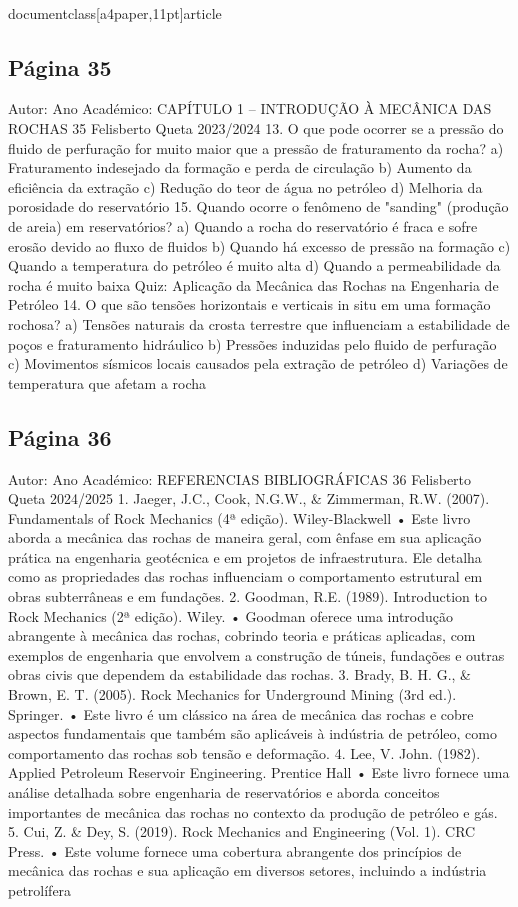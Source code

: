 \\documentclass[a4paper,11pt]{article}
\begin{document}
\subsection*{Página 35}
Autor:
Ano Académico:
CAPÍTULO 1 – INTRODUÇÃO À MECÂNICA DAS ROCHAS
35
Felisberto Queta
2023/2024
13. O que pode ocorrer se a pressão do fluido de perfuração for muito maior que a pressão de fraturamento da 
rocha?
a) Fraturamento indesejado da formação e perda de circulação
b) Aumento da eficiência da extração
c) Redução do teor de água no petróleo
d) Melhoria da porosidade do reservatório
15. Quando ocorre o fenômeno de "sanding" (produção de areia) em reservatórios?
a) Quando a rocha do reservatório é fraca e sofre erosão devido ao fluxo de fluidos
b) Quando há excesso de pressão na formação
c) Quando a temperatura do petróleo é muito alta
d) Quando a permeabilidade da rocha é muito baixa
Quiz: Aplicação da Mecânica das Rochas na Engenharia de Petróleo
14. O que são tensões horizontais e verticais in situ em uma formação rochosa?
a) Tensões naturais da crosta terrestre que influenciam a estabilidade de poços e fraturamento hidráulico
b) Pressões induzidas pelo fluido de perfuração
c) Movimentos sísmicos locais causados pela extração de petróleo
d) Variações de temperatura que afetam a rocha



\subsection*{Página 36}
Autor:
Ano Académico:
REFERENCIAS BIBLIOGRÁFICAS
36
Felisberto Queta
2024/2025
1. Jaeger, J.C., Cook, N.G.W., \& Zimmerman, R.W. (2007). Fundamentals of Rock Mechanics (4ª edição). 
Wiley-Blackwell
•
Este livro aborda a mecânica das rochas de maneira geral, com ênfase em sua aplicação prática na 
engenharia geotécnica e em projetos de infraestrutura. Ele detalha como as propriedades das rochas 
influenciam o comportamento estrutural em obras subterrâneas e em fundações.
2. Goodman, R.E. (1989). Introduction to Rock Mechanics (2ª edição). Wiley.
•
Goodman oferece uma introdução abrangente à mecânica das rochas, cobrindo teoria e práticas 
aplicadas, com exemplos de engenharia que envolvem a construção de túneis, fundações e outras obras 
civis que dependem da estabilidade das rochas.
3. Brady, B. H. G., \& Brown, E. T. (2005). Rock Mechanics for Underground Mining (3rd ed.). Springer.
•
Este livro é um clássico na área de mecânica das rochas e cobre aspectos fundamentais que também 
são aplicáveis à indústria de petróleo, como comportamento das rochas sob tensão e deformação.
4. Lee, V. John. (1982). Applied Petroleum Reservoir Engineering. Prentice Hall
•
Este livro fornece uma análise detalhada sobre engenharia de reservatórios e aborda conceitos 
importantes de mecânica das rochas no contexto da produção de petróleo e gás.
5. Cui, Z. \& Dey, S. (2019). Rock Mechanics and Engineering (Vol. 1). CRC Press.
•
Este volume fornece uma cobertura abrangente dos princípios de mecânica das rochas e sua aplicação 
em diversos setores, incluindo a indústria petrolífera
\end{document}
